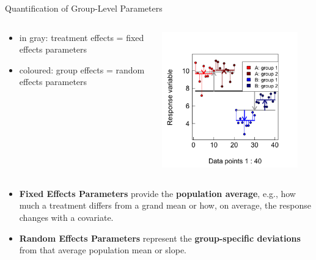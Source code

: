 \documentclass{beamer}
\begin{document}
\begin{frame}{Quantification of Group-Level Parameters}

\begin{columns}[onlytextwidth] 
  \begin{column}{0.4\textwidth}
  \begin{itemize}
      \item in gray: treatment effects = fixed effects parameters
      \item coloured: group effects = random effects parameters
  \end{itemize}
    \end{column}
    \hspace{0.02\textwidth} %
    \begin{column}{0.5\textwidth}
      \begin{center}
        \includegraphics[width=0.9\textwidth]{lectures/day_1_intro_to_mems/figures/unnamed-chunk-36-1.png}
      \end{center}
    \end{column}
  \end{columns}
  
  \begin{itemize}
    \item \textbf{Fixed Effects Parameters} provide the \textbf{population average}, e.g., how much a treatment differs from a grand mean or how, on average, the response changes with a covariate.
    \item \textbf{Random Effects Parameters} represent the \textbf{group-specific deviations} from that average population mean or slope.
  \end{itemize}
  
\end{frame}
\end{document}
